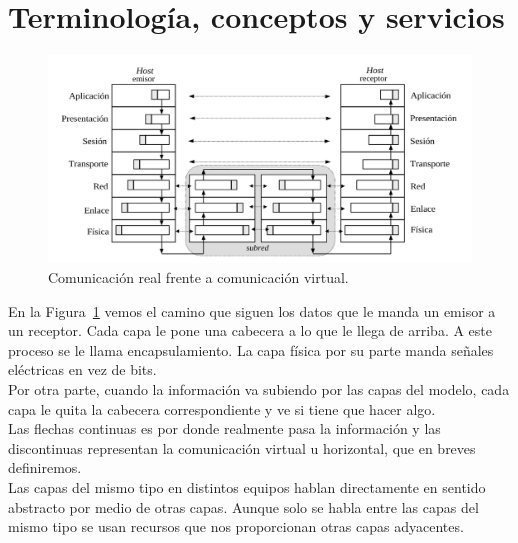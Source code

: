 \section{Terminología, conceptos y servicios}

\begin{figure}
    \centering
    \includegraphics[width=0.8\linewidth]{./images/comunicacionHosts.png}
    \caption{Comunicación real frente a comunicación virtual.}
    \label{fig:comHosts}
\end{figure}

En la Figura~\ref{fig:comHosts} vemos el camino que siguen los datos que le manda un emisor a un receptor. Cada capa le pone una cabecera a lo que le llega de arriba. A este proceso se le llama encapsulamiento. La capa física por su parte manda señales eléctricas en vez de bits. \\

Por otra parte, cuando la información va subiendo por las capas del modelo, cada capa le quita la cabecera correspondiente y ve si tiene que hacer algo. \\

Las flechas continuas es por donde realmente pasa la información y las discontinuas representan la comunicación virtual u horizontal, que en breves definiremos. \\

Las capas del mismo tipo en distintos equipos hablan directamente en sentido abstracto por medio de otras capas. Aunque solo se habla entre las capas del mismo tipo se usan recursos que nos proporcionan otras capas adyacentes. \\

